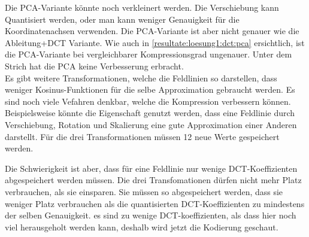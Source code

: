 Die PCA-Variante könnte noch verkleinert werden. Die Verschiebung kann Quantisiert werden, oder man kann weniger Genauigkeit für die Koordinatenachsen verwenden. Die PCA-Variante ist aber nicht genauer wie die Ableitung+DCT Variante. Wie auch in \ref{resultate:loesung1:dct:pca} ersichtlich, ist die PCA-Variante bei vergleichbarer Kompressionsgrad ungenauer. Unter dem Strich hat die PCA keine Verbesserung erbracht.\\
[\baselineskip]
Es gibt weitere Transformationen, welche die Feldlinien so darstellen, dass weniger Kosinus-Funktionen für die selbe Approximation gebraucht werden. 
Es sind noch viele Vefahren denkbar, welche die Kompression verbessern können. Beispielsweise könnte die Eigenschaft genutzt werden, dass eine Feldlinie durch Verschiebung, Rotation und Skalierung eine gute Approximation einer Anderen darstellt.  Für die drei Transformationen müssen 12 neue Werte gespeichert werden. 

Die Schwierigkeit ist aber, dass für eine Feldlinie nur wenige DCT-Koeffizienten abgespeichert werden müssen. Die drei Transfomationen dürfen nicht mehr Platz verbrauchen, als sie einsparen. Sie müssen so abgespeichert werden, dass sie weniger Platz verbrauchen als die quantisierten DCT-Koeffizienten zu mindestens der selben Genauigkeit. es sind zu wenige DCT-koeffizienten, als dass hier noch viel herausgeholt werden kann, deshalb wird jetzt die Kodierung geschaut.

